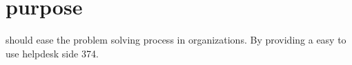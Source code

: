 \section{purpose}
\hdesk[] should ease the problem solving process in organizations. By providing a easy to use helpdesk side 374.